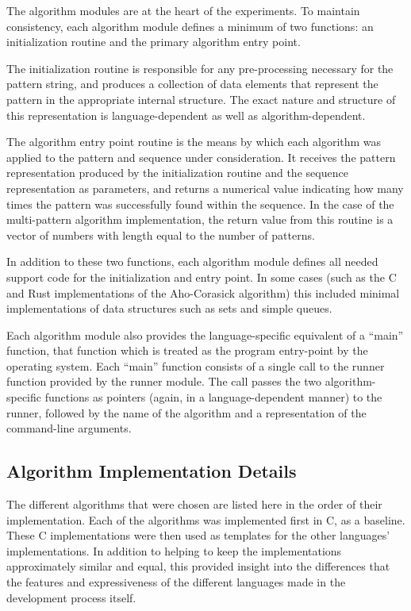 The algorithm modules are at the heart of the experiments. To maintain consistency, each algorithm module defines a minimum of two functions: an initialization routine and the primary algorithm entry point.

The initialization routine is responsible for any pre-processing necessary for the pattern string, and produces a collection of data elements that represent the pattern in the appropriate internal structure. The exact nature and structure of this representation is language-dependent as well as algorithm-dependent.

The algorithm entry point routine is the means by which each algorithm was applied to the pattern and sequence under consideration. It receives the pattern representation produced by the initialization routine and the sequence representation as parameters, and returns a numerical value indicating how many times the pattern was successfully found within the sequence. In the case of the multi-pattern algorithm implementation, the return value from this routine is a vector of numbers with length equal to the number of patterns.

In addition to these two functions, each algorithm module defines all needed support code for the initialization and entry point. In some cases (such as the C and Rust implementations of the Aho-Corasick algorithm) this included minimal implementations of data structures such as sets and simple queues.

Each algorithm module also provides the language-specific equivalent of a ``main'' function, that function which is treated as the program entry-point by the operating system. Each ``main'' function consists of a single call to the runner function provided by the runner module. The call passes the two algorithm-specific functions as pointers (again, in a language-dependent manner) to the runner, followed by the name of the algorithm and a representation of the command-line arguments.

\subsection{Algorithm Implementation Details}

The different algorithms that were chosen are listed here in the order of their implementation. Each of the algorithms was implemented first in C, as a baseline. These C implementations were then used as templates for the other languages' implementations. In addition to helping to keep the implementations approximately similar and equal, this provided insight into the differences that the features and expressiveness of the different languages made in the development process itself.

